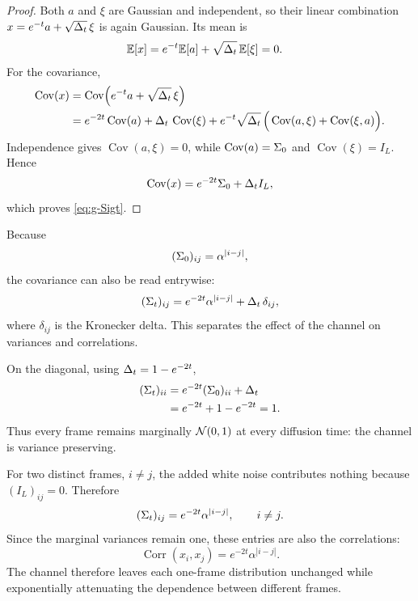 \begin{proof}
Both $a$ and $\xi$ are Gaussian and independent, so their linear combination
$x=e^{-t}a+\sqrt{\Delta_t}\,\xi$ is again Gaussian. Its mean is
\begin{align}
  \mathbb{E}[x]
  &=
  e^{-t}\mathbb{E}[a]
  +
  \sqrt{\Delta_t}\,\mathbb{E}[\xi]
  =0.
\end{align}
For the covariance,
\begin{align}
  \operatorname{Cov}(x)
  &=
  \operatorname{Cov}\!\left(
    e^{-t}a+\sqrt{\Delta_t}\,\xi
  \right)\\
  &=
  e^{-2t}\operatorname{Cov}(a)
  +
  \Delta_t\,\operatorname{Cov}(\xi)
  +
  e^{-t}\sqrt{\Delta_t}\,
  \Big(
    \operatorname{Cov}(a,\xi)+\operatorname{Cov}(\xi,a)
  \Big).
\end{align}
Independence gives
$\operatorname{Cov}(a,\xi)=0$, while
$\operatorname{Cov}(a)=\Sigma_0$ and $\operatorname{Cov}(\xi)=I_L$. Hence
\begin{equation}
  \operatorname{Cov}(x)
  =
  e^{-2t}\Sigma_0+\Delta_t I_L,
\end{equation}
which proves \eqref{eq:g-Sigt}.
\end{proof}

Because
\[
  (\Sigma_0)_{ij}=\alpha^{|i-j|},
\]
the covariance can also be read entrywise:
\begin{equation}
  (\Sigma_t)_{ij}
  =
  e^{-2t}\alpha^{|i-j|}
  +
  \Delta_t\,\delta_{ij},
  \label{eq:g-Sigt-entrywise}
\end{equation}
where $\delta_{ij}$ is the Kronecker delta. This separates the effect of the
channel on variances and correlations.

On the diagonal, using $\Delta_t=1-e^{-2t}$,
\begin{align}
  (\Sigma_t)_{ii}
  &=
  e^{-2t}(\Sigma_0)_{ii}+\Delta_t\\
  &=
  e^{-2t}+1-e^{-2t}
  =1.
\end{align}
Thus every frame remains marginally $\mathcal{N}(0,1)$ at every diffusion time: the
channel is variance preserving.

For two distinct frames, $i\neq j$, the added white noise contributes
nothing because $(I_L)_{ij}=0$. Therefore
\begin{equation}
  (\Sigma_t)_{ij}
  =
  e^{-2t}\alpha^{|i-j|},
  \qquad i\neq j.
  \label{eq:g-Sigt-offdiag}
\end{equation}
Since the marginal variances remain one, these entries are also the
correlations:
\begin{equation}
  \operatorname{Corr}(x_i,x_j)
  =
  e^{-2t}\alpha^{|i-j|}.
  \label{eq:g-noisy-correlation}
\end{equation}
The channel therefore leaves each one-frame distribution unchanged while
exponentially attenuating the dependence between different frames.

